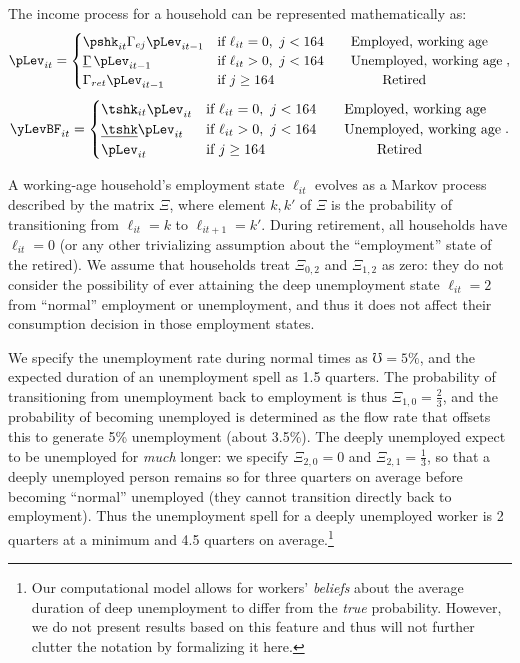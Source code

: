 \documentclass[./ConsumptionResponse]{subfiles}
\begin{document}
The income process for a household can be represented mathematically as:
\begin{equation*}
  \pLev_{it} = \begin{cases}
    \pshk_{it} \Gamma_{ej} \pLev_{it-1} & \text{if } \ell_{it} = 0,~ j < 164 \qquad\text{Employed, working age}\\
    \underline{\Gamma}\, \pLev_{it-1} & \text{if } \ell_{it} > 0,~ j < 164 \qquad\text{Unemployed, working age}\\
    \Gamma_{ret} \pLev_{it-1} & \text{if } j \geq 164 \qquad \qquad \qquad \qquad \text{Retired}
  \end{cases},
\end{equation*}
\begin{equation*}
  \yLevBF_{it} = \begin{cases}
    \tshk_{it} \pLev_{it} & \text{if } \ell_{it} = 0,~ j < 164 \qquad\text{Employed, working age}\\
    \underline{\tshk} \pLev_{it} & \text{if } \ell_{it} > 0,~ j < 164 \qquad\text{Unemployed, working age}\\
    \pLev_{it} & \text{if } j \geq 164 \qquad \qquad \qquad \qquad \text{Retired}
  \end{cases}.
\end{equation*}


A working-age household's employment state $\ell_{it}$ evolves as a Markov process described by the matrix $\Xi$, where element $k,k'$ of $\Xi$ is the probability of transitioning from $\ell_{it} = k$ to $\ell_{it+1} = k'$.  During retirement, all households have $\ell_{it}=0$ (or any other trivializing assumption about the ``employment'' state of the retired).
We assume that households treat $\Xi_{0,2}$ and $\Xi_{1,2}$ as zero: they do not consider the possibility of ever attaining the deep unemployment state $\ell_{it}=2$ from ``normal'' employment or unemployment, and thus it does not affect their consumption decision in those employment states.

We specify the unemployment rate during normal times as $\mho = 5\%$, and the expected duration of an unemployment spell as 1.5 quarters.
The probability of transitioning from unemployment back to employment is thus $\Xi_{1,0} = \frac{2}{3}$, and the probability of becoming unemployed is determined as the flow rate that offsets this to generate 5\% unemployment (about 3.5\%).
The deeply unemployed expect to be unemployed for \textit{much} longer: we specify $\Xi_{2,0} = 0$ and $\Xi_{2,1} = \frac{1}{3}$, so that a deeply unemployed person remains so for three quarters on average before becoming ``normal'' unemployed (they cannot transition directly back to employment).
Thus the unemployment spell for a deeply unemployed worker is 2 quarters at a minimum and 4.5 quarters on average.\footnote{Our computational model allows for workers' \textit{beliefs} about the average duration of deep unemployment to differ from the \textit{true} probability.  However, we do not present results based on this feature and thus will not further clutter the notation by formalizing it here.}
\end{document}
